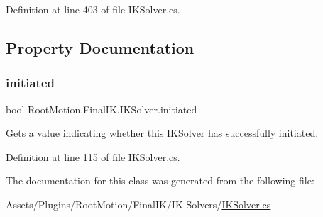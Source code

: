 Definition at line 403 of file I\+K\+Solver.\+cs.



\subsection{Property Documentation}
\mbox{\label{class_root_motion_1_1_final_i_k_1_1_i_k_solver_ab25232fc4362b290dcd5ee1cfa96ef5e}} 
\subsubsection{\texorpdfstring{initiated}{initiated}}
{\footnotesize\ttfamily bool Root\+Motion.\+Final\+I\+K.\+I\+K\+Solver.\+initiated\hspace{0.3cm}{\ttfamily [get]}}



Gets a value indicating whether this \mbox{\hyperlink{class_root_motion_1_1_final_i_k_1_1_i_k_solver}{I\+K\+Solver}} has successfully initiated. 



Definition at line 115 of file I\+K\+Solver.\+cs.



The documentation for this class was generated from the following file\+:\begin{DoxyCompactItemize}
\item 
Assets/\+Plugins/\+Root\+Motion/\+Final\+I\+K/\+I\+K Solvers/\mbox{\hyperlink{_i_k_solver_8cs}{I\+K\+Solver.\+cs}}\end{DoxyCompactItemize}
